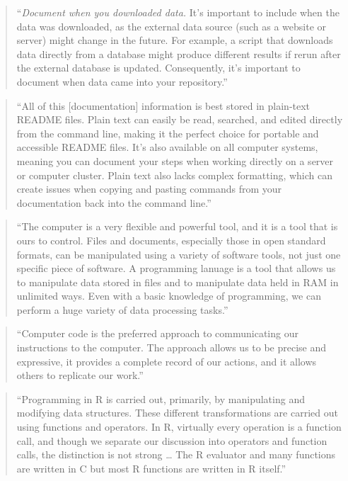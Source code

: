 \documentclass[]{tufte-book}
\begin{document}
\begin{quote}
``\emph{Document when you downloaded data.} It's important to include when the data was downloaded,
as the external data source (such as a website or server) might change in the future. For example,
a script that downloads data directly from a database might produce different results if
rerun after the external database is updated. Consequently, it's important to document
when data came into your repository.'' \citep{buffalo2015bioinformatics}
\end{quote}

\begin{quote}
``All of this {[}documentation{]} information is best stored in plain-text README files.
Plain text can easily be read, searched, and edited directly from the command line,
making it the perfect choice for portable and accessible README files. It's also available
on all computer systems, meaning you can document your steps when working directly on
a server or computer cluster. Plain text also lacks complex formatting, which can create
issues when copying and pasting commands from your documentation back into the command
line.'' \citep{buffalo2015bioinformatics}
\end{quote}

\begin{quote}
``The computer is a very flexible and powerful tool, and it is a tool that is ours
to control. Files and documents, especially those in open standard formats, can be
manipulated using a variety of software tools, not just one specific piece of software.
A programming lanuage is a tool that allows us to manipulate data stored in files and
to manipulate data held in RAM in unlimited ways. Even with a basic knowledge of
programming, we can perform a huge variety of data processing tasks.'' \citep{murrell2009introduction}
\end{quote}

\begin{quote}
``Computer code is the preferred approach to communicating our instructions to the
computer. The approach allows us to be precise and expressive, it provides a complete
record of our actions, and it allows others to replicate our work.'' \citep{murrell2009introduction}
\end{quote}

\begin{quote}
``Programming in R is carried out, primarily, by manipulating and modifying data structures.
These different transformations are carried out using functions and operators. In R,
virtually every operation is a function call, and though we separate our discussion into
operators and function calls, the distinction is not strong \ldots{} The R evaluator and
many functions are written in C but most R functions are written in R itself.''
\citep{gentleman2008r}
\end{quote}
\end{document}
